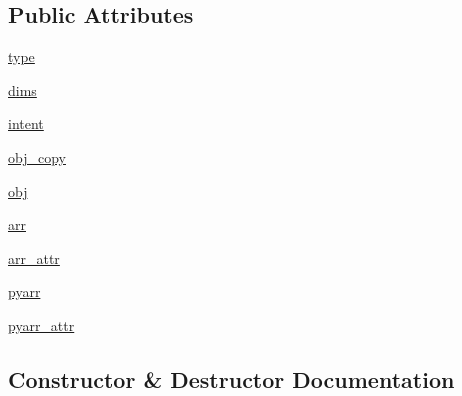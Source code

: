 \subsection*{Public Attributes}
\begin{DoxyCompactItemize}
\item 
\hyperlink{classnumpy_1_1f2py_1_1tests_1_1test__array__from__pyobj_1_1Array_a7e87e6b9c420aac65536131d71dbcf72}{type}
\item 
\hyperlink{classnumpy_1_1f2py_1_1tests_1_1test__array__from__pyobj_1_1Array_a230940fbf08c704899d614ff5d32124d}{dims}
\item 
\hyperlink{classnumpy_1_1f2py_1_1tests_1_1test__array__from__pyobj_1_1Array_a98409f57ba6dd18e664ee1f96e217006}{intent}
\item 
\hyperlink{classnumpy_1_1f2py_1_1tests_1_1test__array__from__pyobj_1_1Array_a8bfd264860b7d3d34bb0b83d84f54892}{obj\+\_\+copy}
\item 
\hyperlink{classnumpy_1_1f2py_1_1tests_1_1test__array__from__pyobj_1_1Array_a346a63862c3845a41e9bea185c736573}{obj}
\item 
\hyperlink{classnumpy_1_1f2py_1_1tests_1_1test__array__from__pyobj_1_1Array_ab41cb024e29867358dbd2f9fecc55183}{arr}
\item 
\hyperlink{classnumpy_1_1f2py_1_1tests_1_1test__array__from__pyobj_1_1Array_acca5e8fb8a4738093b81230429e9b0d5}{arr\+\_\+attr}
\item 
\hyperlink{classnumpy_1_1f2py_1_1tests_1_1test__array__from__pyobj_1_1Array_a790fa4747d8b536284f3b16fee476f3d}{pyarr}
\item 
\hyperlink{classnumpy_1_1f2py_1_1tests_1_1test__array__from__pyobj_1_1Array_a042620bdec0327beefdf90ac07fc387b}{pyarr\+\_\+attr}
\end{DoxyCompactItemize}


\subsection{Constructor \& Destructor Documentation}
\mbox{\label{classnumpy_1_1f2py_1_1tests_1_1test__array__from__pyobj_1_1Array_a0ede537d64a7119d83be5d4f65207cfb}} 
